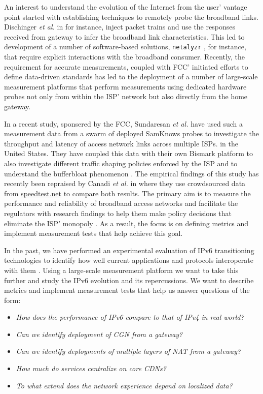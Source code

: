 An interest to understand the evolution of the Internet from the user' vantage
point started with establishing techniques to remotely probe the broadband
links. Dischinger \emph{et al.} in \cite{dischinger:2007} for instance, inject
packet trains and use the responses received from gateway to infer the
broadband link characteristics. This led to development of a number of
software-based solutions, \texttt{netalyzr} \cite{kreibich:2010}, for
instance, that require explicit interactions with the broadband consumer.
Recently, the requirement for accurate measurements, coupled with \ac{FCC}'
initiated efforts to define data-driven standards has led to the deployment of
a number of large-scale measurement platforms that perform measurements using
dedicated hardware probes not only from within the ISP' network but also
directly from the home gateway. 

In a recent study, sponsered by the \ac{FCC}, Sundaresan \emph{et al.}
\cite{sundaresan:2011} have used such a measurement data from a swarm of
deployed SamKnows probes to investigate the throughput and latency of access
network links across multiple ISPs. in the United States. They have coupled
this data with their own Bismark platform \cite{sundaresan:2012} to also
investigate different traffic shaping policies enforced by the ISP and to
understand the bufferbloat phenomenon \cite{gettys:2012}.  The empirical
findings of this study has recently been repraised by Canadi \emph{et al.} in
\cite{canadi:2012} where they use crowdsourced data from \url{speedtest.net}
to compare both results. The primary aim is to measure the performance and
reliability of broadband access networks and facilitate the regulators with
research findings to help them make policy decisions that eliminate the ISP'
monopoly \cite{draft-schulzrinne-lmap-requirements-00}.  As a result, the
focus is on defining metrics and implement measurement tests that help achieve
this goal.

In the past, we have performed an experimental evaluation of IPv6
transitioning technologies to identify how well current applications and
protocols interoperate with them \cite{vbajpai:2012}. Using a large-scale
measurement platform we want to take this further and study the IPv6 evolution
and its repercussions. We want to describe metrics and implement measurement
tests that help us answer questions of the form:

\begin{itemize}
  \item \emph{How does the performance of IPv6 compare to that of IPv4 in real world?}
  \item \emph{Can we identify deployment of \ac{CGN} from a gateway?}
  \item \emph{Can we identify deployments of multiple layers of NAT from a gateway?}
  \item \emph{How much do services centralize on core \ac{CDN}s?}
  \item \emph{To what extend does the network experience depend on
              localized data?}
\end{itemize}

